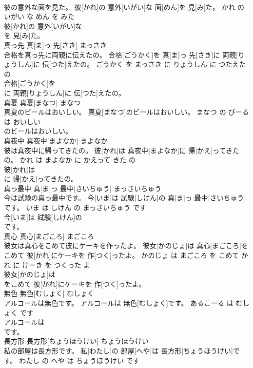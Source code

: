 \documentclass[8pt]{extreport}
\begin{document}
\begin{CJK}{UTF8}{min}
\\	彼の意外な面を見た。	彼[かれ]の 意外[いがい]な 面[めん]を 見[み]た。	かれ の いがい な めん を みた	
\\	彼[かれ]の 意外[いがい]な
\\	を 見[み]た。			
\\	真っ先	真[ま]っ 先[さき]	まっさき	
\\	合格を真っ先に両親に伝えたの。	合格[ごうかく]を 真[ま]っ 先[さき]に 両親[りょうしん]に 伝[つた]えたの。	ごうかく を まっさき に りょうしん に つたえた の	
\\	合格[ごうかく]を
\\	に 両親[りょうしん]に 伝[つた]えたの。			
\\	真夏	真夏[まなつ]	まなつ	
\\	真夏のビールはおいしい。	真夏[まなつ]のビールはおいしい。	まなつ の びーる は おいしい	
\\	のビールはおいしい。			
\\	真夜中	真夜中[まよなか]	まよなか	
\\	彼は真夜中に帰ってきたの。	彼[かれ]は 真夜中[まよなか]に 帰[かえ]ってきたの。	かれ は まよなか に かえって きた の	
\\	彼[かれ]は
\\	に 帰[かえ]ってきたの。			
\\	真っ最中	真[ま]っ 最中[さいちゅう]	まっさいちゅう	
\\	今は試験の真っ最中です。	今[いま]は 試験[しけん]の 真[ま]っ 最中[さいちゅう]です。	いま は しけん の まっさいちゅう です	
\\	今[いま]は 試験[しけん]の
\\	です。			
\\	真心	真心[まごころ]	まごころ	
\\	彼女は真心をこめて彼にケーキを作ったよ。	彼女[かのじょ]は 真心[まごころ]をこめて 彼[かれ]にケーキを 作[つく]ったよ。	かのじょ は まごころ を こめて かれ に けーき を つくった よ	
\\	彼女[かのじょ]は
\\	をこめて 彼[かれ]にケーキを 作[つく]ったよ。			
\\	無色	無色[むしょく]	むしょく	
\\	アルコールは無色です。	アルコールは 無色[むしょく]です。	あるこーる は むしょく です	
\\	アルコールは
\\	です。			
\\	長方形	長方形[ちょうほうけい]	ちょうほうけい	
\\	私の部屋は長方形です。	私[わたし]の 部屋[へや]は 長方形[ちょうほうけい]です。	わたし の へや は ちょうほうけい です	

\end{CJK}
\end{document}
